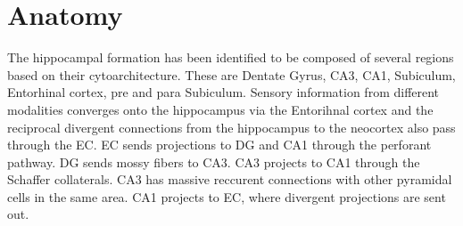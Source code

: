 \section{Anatomy}
The hippocampal formation has been identified to be composed of several regions based on their cytoarchitecture. These are Dentate Gyrus, CA3, CA1, Subiculum, Entorhinal cortex, pre and para Subiculum. Sensory information from different modalities converges onto the hippocampus via the Entorihnal cortex and the reciprocal divergent connections from the hippocampus to the neocortex also pass through the EC. EC sends projections to DG and CA1 through the perforant pathway. DG sends mossy fibers to CA3. CA3 projects to CA1 through the Schaffer collaterals. CA3 has massive reccurent connections with other pyramidal cells in the same area. CA1 projects to EC, where divergent projections are sent out. 
